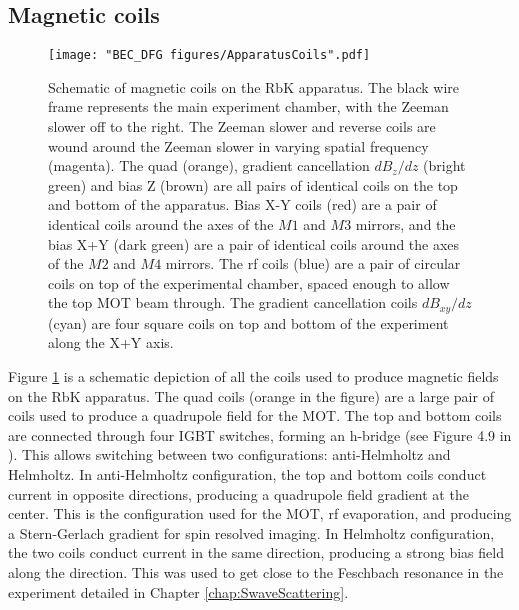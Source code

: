 \subsection{Magnetic coils}\label{sec:magneticCoils}
\begin{figure}
	\texttt{[image: "BEC\_DFG figures/ApparatusCoils".pdf]}
\caption[Schematic of magnetic coils on the RbK apparatus]{Schematic of magnetic coils on the RbK apparatus. The black wire frame represents the main experiment chamber, with the Zeeman slower off to the right. The Zeeman slower and reverse coils are wound around the Zeeman slower in varying spatial frequency (magenta). The quad (orange), gradient cancellation $dB_z/dz$ (bright green) and bias Z (brown) are all pairs of identical coils on the top and bottom of the apparatus. Bias X-Y coils (red) are a pair of identical coils around the axes of the $M1$ and $M3$ mirrors, and the bias X+Y (dark green) are a pair of identical coils around the axes of the $M2$ and $M4$ mirrors. The rf coils (blue) are a pair of circular coils on top of the experimental chamber, spaced enough to allow the top MOT beam through. The gradient cancellation coils $dB_{xy}/dz$ (cyan) are four square coils on top and bottom of the experiment along the X+Y axis. }
\label{fig:ApparatusCoils}
\end{figure}

Figure \ref{fig:ApparatusCoils} is a schematic depiction of all the coils used to produce magnetic fields on the RbK apparatus. The quad coils (orange in the figure) are a large pair of coils used to produce a quadrupole field for the MOT. The top and bottom coils are connected through four IGBT switches, forming an h-bridge (see Figure 4.9 in \cite{AycockThesis}). This allows switching between two configurations: anti-Helmholtz and Helmholtz. In anti-Helmholtz configuration, the top and bottom coils conduct current in opposite directions, producing a quadrupole field gradient at the center. This is the configuration used for the MOT, rf evaporation, and producing a Stern-Gerlach gradient for spin resolved imaging. In Helmholtz configuration, the two coils conduct current in the same direction, producing a strong bias field along the \ez{} direction. This was used to get close to the Feschbach resonance in the experiment detailed in Chapter \ref{chap:SwaveScattering}. 

